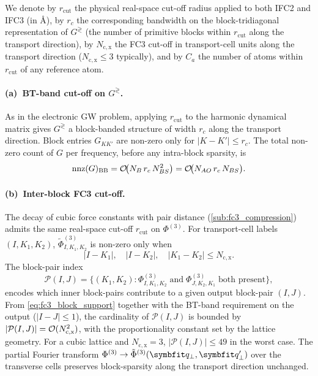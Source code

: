 We denote by $r_{\mathrm{cut}}$ the physical real-space cut-off
radius applied to both IFC2 and IFC3 (in \AA), by $r_c$ the
corresponding bandwidth on the block-tridiagonal representation of
$G^{\gtrless}$ (the number of primitive blocks within $r_{\mathrm{cut}}$
along the transport direction), by $N_\mathrm{c,x}$ the FC3 cut-off
in transport-cell units along the transport direction
($N_\mathrm{c,x}\le 3$ typically), and by $C_a$ the number of atoms
within $r_{\mathrm{cut}}$ of any reference atom.

\paragraph{(a)~BT-band cut-off on $G^{\gtrless}$.} As in the
electronic GW problem, applying $r_{\mathrm{cut}}$ to the harmonic
dynamical matrix gives $G^{\gtrless}$ a block-banded structure of
width $r_c$ along the transport direction. Block entries $G_{KK'}$
are non-zero only for $|K-K'|\le r_c$. The total non-zero count of
$G$ per frequency, before any intra-block sparsity, is
\begin{equation}\label{eq:G_bb_nnz}
  \mathrm{nnz}(G)_\mathrm{BB}
  = \mathcal{O}\!\bigl(N_{B}\,r_c\,N_{BS}^{2}\bigr)
  = \mathcal{O}\!\bigl(N_{AO}\,r_c\,N_{BS}\bigr).
\end{equation}

\paragraph{(b)~Inter-block FC3 cut-off.} The decay of cubic force
constants with pair distance (\cref{sub:fc3_compression}) admits the
same real-space cut-off $r_{\mathrm{cut}}$ on $\Phi^{(3)}$. For
transport-cell labels $(I,K_1,K_2)$, $\tilde\Phi^{(3)}_{I,K_1,K_2}$
is non-zero only when
\begin{equation}\label{eq:fc3_block_support}
  |I-K_1|, \quad |I-K_2|, \quad |K_1-K_2| \le N_\mathrm{c,x}.
\end{equation}
The block-pair index
\begin{equation}\label{eq:phph_pair_index}
  \mathcal{P}(I,J)
  = \bigl\{(K_1,K_2) :
      \Phi^{(3)}_{I,K_1,K_2}\;\text{and}\;
      \Phi^{(3)}_{J,K_2,K_1}\;\text{both present}\bigr\},
\end{equation}
encodes which inner block-pairs contribute to a given output
block-pair $(I,J)$. From \cref{eq:fc3_block_support} together with
the BT-band requirement on the output ($|I-J|\le 1$), the cardinality
of $\mathcal{P}(I,J)$ is bounded by
$|\mathcal{P}(I,J)| = \mathcal{O}(N_\mathrm{c,x}^{2})$, with the proportionality
constant set by the lattice geometry. For a cubic lattice and
$N_\mathrm{c,x}=3$, $|\mathcal{P}(I,J)|\le 49$ in the worst case.
The partial Fourier transform $\Phi^{(3)} \to \tilde\Phi^{(3)}(\qp,\qp')$
over the transverse cells preserves block-sparsity along the transport direction unchanged.

